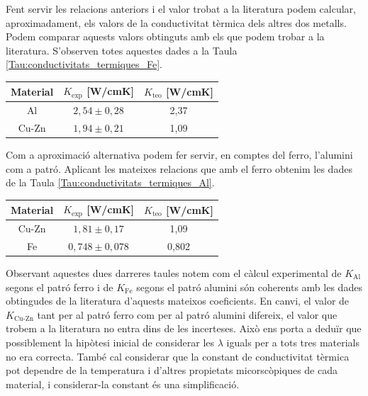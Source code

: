 \documentclass[12pt,twosides,onecolumn,openany]{article}
\newenvironment{Figura}
  {\par\medskip\noindent\minipage{\linewidth}}
  {\endminipage\par\medskip}
\begin{document}
\begin{multicols}{2}
Fent servir les relacions anteriors i el valor trobat a la literatura podem calcular, aproximadament, els valors de la conductivitat tèrmica dels altres dos metalls. Podem comparar aquests valors obtinguts amb els que podem trobar a la literatura. S'observen totes aquestes dades a la Taula \ref{Tau:conductivitats_termiques_Fe}.
\begin{Figura}
  \centering
  \begin{tabular}{c|c|c}
    Material & $K_{\text{exp}}$ [W/cmK] & $K_{\text{teo}}$ [W/cmK]\\
    \hline\hline
    Al & $2,54\pm0,28$ & 2,37\\
    Cu-Zn & $1,94\pm0,21$ & 1,09
  \end{tabular}
  \label{Tau:conductivitats_termiques_Fe}
\end{Figura}
Com a aproximació alternativa podem fer servir, en comptes del ferro, l'alumini com a patró. Aplicant les mateixes relacions que amb el ferro obtenim les dades de la Taula \ref{Tau:conductivitats_termiques_Al}.
\begin{Figura}
  \centering
  \begin{tabular}{c|c|c}
    Material & $K_{\text{exp}}$ [W/cmK] & $K_{\text{teo}}$ [W/cmK]\\
    \hline\hline
    Cu-Zn & $1,81\pm0,17$ & 1,09\\
    Fe & $0,748\pm0,078$ & 0,802
  \end{tabular}
  \label{Tau:conductivitats_termiques_Al}
\end{Figura}
Observant aquestes dues darreres taules notem com el càlcul experimental de $K_{\text{Al}}$ segons el patró ferro i de $K_{\text{Fe}}$ segons el patró alumini són coherents amb les dades obtingudes de la literatura d'aquests mateixos coeficients. En canvi, el valor de $K_{\text{Cu-Zn}}$ tant per al patró ferro com per al patró alumini difereix, el valor que trobem a la literatura no entra dins de les incerteses. Això ens porta a deduïr que possiblement la hipòtesi inicial de considerar les $\lambda$ iguals per a tots tres materials no era correcta. També cal considerar que la constant de conductivitat tèrmica pot dependre de la temperatura i d'altres propietats micorscòpiques de cada material, i considerar-la constant és una simplificació.\cite{Ausloos}\\\\

\end{multicols}
\end{document}
